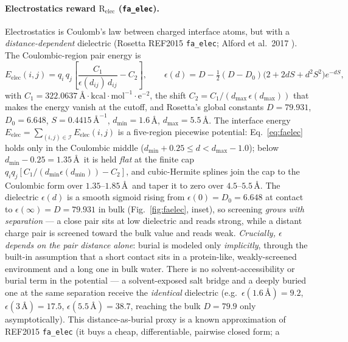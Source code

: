 \documentclass[11pt]{article}
\newcommand{\R}{\mathrm{R}}
\newcommand{\ttk}[1]{\texttt{\small #1}}
\begin{document}
\paragraph{Electrostatics reward $\R_{\mathrm{elec}}$ (\ttk{fa\_elec}).} Electrostatics is Coulomb's
law between charged interface atoms, but with a \emph{distance-dependent} dielectric (Rosetta REF2015
\ttk{fa\_elec}; Alford et al.\ 2017 \cite{alford2017}). The Coulombic-region pair energy is
\begin{equation}
E_{\mathrm{elec}}(i,j)=q_i\,q_j\!\left[\frac{C_1}{\epsilon(d_{ij})\,d_{ij}}-C_2\right],
\qquad
\epsilon(d)=D-\tfrac{1}{2}(D-D_0)\bigl(2+2dS+d^2S^2\bigr)e^{-dS},
\label{eq:faelec}
\end{equation}
with $C_1=322.0637\ \text{\AA}\cdot\text{kcal}\cdot\text{mol}^{-1}\!\cdot\text{e}^{-2}$, the shift
$C_2=C_1/(d_{\max}\,\epsilon(d_{\max}))$ that makes the energy vanish at the cutoff, and Rosetta's
global constants $D=79.931$, $D_0=6.648$, $S=0.4415\,\text{\AA}^{-1}$, $d_{\min}=1.6$\,\AA,
$d_{\max}=5.5$\,\AA. The interface energy $E_{\mathrm{elec}}=\sum_{(i,j)\in\mathcal I}E_{\mathrm{elec}}(i,j)$
is a five-region piecewise potential: Eq.\ \ref{eq:faelec} holds only in the Coulombic middle
($d_{\min}{+}0.25\le d<d_{\max}{-}1.0$); below $d_{\min}{-}0.25=1.35$\,\AA\ it is held \emph{flat} at
the finite cap $q_iq_j[C_1/(d_{\min}\epsilon(d_{\min}))-C_2]$, and cubic-Hermite splines join the cap
to the Coulombic form over $1.35$--$1.85$\,\AA\ and taper it to zero over $4.5$--$5.5$\,\AA. The
dielectric $\epsilon(d)$ is a smooth sigmoid rising from $\epsilon(0)=D_0=6.648$ at contact to
$\epsilon(\infty)=D=79.931$ in bulk (Fig.\ \ref{fig:faelec}, inset), so screening \emph{grows with
separation} --- a close pair sits at low dielectric and reads strong, while a distant
charge pair is screened toward the bulk value and reads weak. \emph{Crucially, $\epsilon$ depends on the
pair distance alone}: burial is modeled only \emph{implicitly}, through the built-in assumption that a
short contact sits in a protein-like, weakly-screened environment and a long one in bulk water. There
is no solvent-accessibility or burial term in the potential --- a solvent-exposed salt bridge and a
deeply buried one at the same separation receive the \emph{identical} dielectric (e.g.\
$\epsilon(1.6\,\text{\AA}){=}9.2$, $\epsilon(3\,\text{\AA}){=}17.5$, $\epsilon(5.5\,\text{\AA}){=}38.7$,
reaching the bulk $D{=}79.9$ only asymptotically). This distance-as-burial proxy is a known
approximation of REF2015 \ttk{fa\_elec} (it buys a cheap, differentiable, pairwise closed form; a
\end{document}
